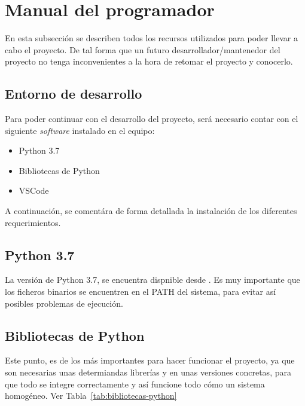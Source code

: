 \section{Manual del programador}
En esta subsección se describen todos los recursos utilizados para poder llevar a cabo el proyecto.
De tal forma que un futuro desarrollador/mantenedor del proyecto no tenga inconvenientes a la hora de retomar el proyecto y conocerlo.

\subsection{Entorno de desarrollo}
Para poder continuar con el desarrollo del proyecto, será necesario contar con el siguiente \textit{software} instalado en el equipo:
\begin{itemize}
    \tightlist
    \item Python 3.7
    \item Bibliotecas de Python
    \item VSCode
    
\end{itemize}

A continuación, se comentára de forma detallada la instalación de los diferentes requerimientos.

\subsection{Python 3.7}
La versión de Python 3.7, se encuentra dispnible desde \cite{pythonDownload}. Es muy importante que los ficheros binarios se encuentren en el PATH del sistema, para evitar así posibles problemas de ejecución.

\subsection{Bibliotecas de Python}
Este punto, es de los más importantes para hacer funcionar el proyecto, ya que son necesarias unas determiandas librerías y en unas versiones concretas, para que todo se integre correctamente y así funcione todo
cómo un sistema homogéneo. Ver Tabla~\ref{tab:bibliotecas-python}

